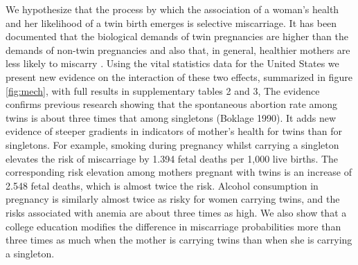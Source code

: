 \documentclass{nature}
\begin{document}
\begin{linenumbers}

We hypothesize that the process by which the association of a woman's health and her likelihood of a twin birth emerges is selective miscarriage. It has been documented that the biological demands of twin pregnancies are higher than the demands of non-twin pregnancies\cite{Shinagawaetal2005,Kahnetal2003} and also that, in general, healthier mothers are less likely to miscarry \cite{Frettsetal1995,Garciaetal2002}. Using the vital statistics data for the United States we present new evidence on the interaction of these two effects, summarized in figure \ref{fig:mech}, with full results in supplementary tables 2 and 3, %
The evidence confirms previous research showing that the spontaneous abortion rate among twins is about three times that among singletons (Boklage 1990). It adds new evidence of steeper gradients in indicators of mother's health for twins than for singletons. For example, smoking during pregnancy whilst carrying a singleton elevates the risk of miscarriage by 1.394 fetal deaths per 1,000 live births. 
The corresponding risk elevation among mothers pregnant with twins is an increase of 2.548 fetal deaths, which is almost twice the risk. 
Alcohol consumption in pregnancy is similarly almost twice as risky for women carrying twins, and the risks associated with anemia are about three times as high. We also show that a college education modifies the difference in miscarriage probabilities more than three times as much when the mother is carrying twins than when she is carrying a singleton. 


\end{linenumbers}
\end{document}
